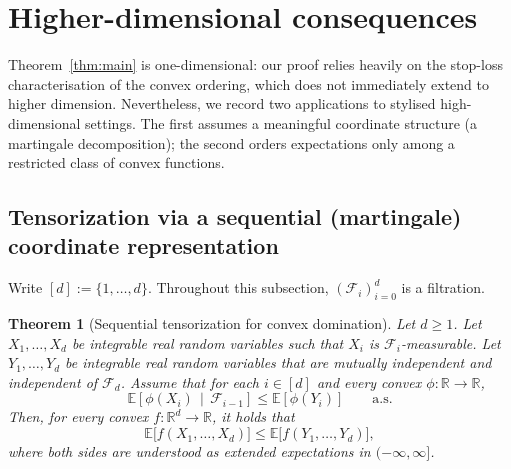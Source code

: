 \documentclass[11pt]{article}
\newcommand{\R}{\mathbb{R}}
\newcommand{\Ebb}{\mathbb{E}}
\newtheorem{theorem}{Theorem}
\begin{document}
\section{Higher-dimensional consequences}

Theorem~\ref{thm:main} is one-dimensional: our proof relies heavily on the stop-loss characterisation of the convex ordering, which does not immediately extend to higher dimension. Nevertheless, we record two applications to stylised high-dimensional settings. The first assumes a meaningful coordinate structure (a martingale decomposition); the second orders expectations only among a restricted class of convex functions.

\subsection*{Tensorization via a sequential (martingale) coordinate representation}

Write $[d]:=\{1,\dots,d\}$.  Throughout this subsection, $(\mathcal F_i)_{i=0}^d$ is a filtration.


\begin{theorem}[Sequential tensorization for convex domination]
\label{thm:sequential_tensorization}
Let $d \ge 1$.  Let $X_1, \dots, X_d$ be integrable real random variables such that $X_i$ is $\mathcal F_i$-measurable.
Let $Y_1, \dots, Y_d$ be integrable real random variables that are mutually independent and independent of $\mathcal F_d$.
Assume that for each $i \in [d]$ and every convex $\phi : \R \to \R$,
%
\begin{equation}
\label{eq:cond_cx_dom}
\Ebb\! \left[\phi(X_i) \, \middle| \, \mathcal F_{i-1} \right] \le \Ebb [ \phi (Y_i)]
\qquad\text{a.s.}
\end{equation}
%
Then, for every convex $f : \R^d \to \R$, it holds that
%
\begin{equation}
\label{eq:sequential_tensor_concl}
\Ebb \big[ f(X_1, \dots, X_d) \big] \le \Ebb \big[ f(Y_1, \dots, Y_d) \big],
\end{equation}
%
where both sides are understood as extended expectations in $(-\infty, \infty]$.
\end{theorem}
\end{document}
